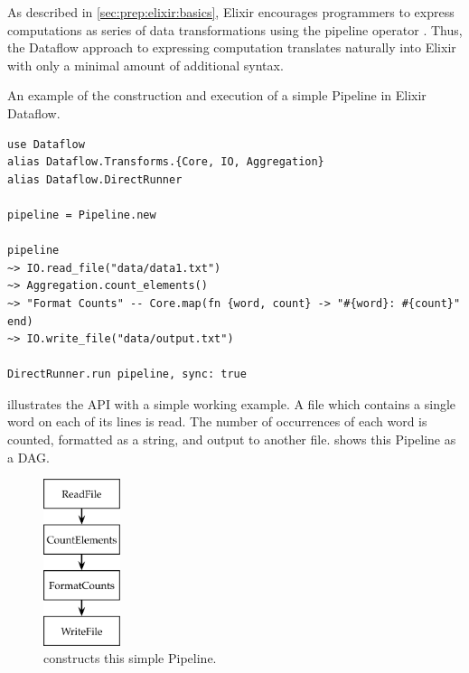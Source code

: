 As described in \cref{sec:prep:elixir:basics}, Elixir encourages programmers to express computations as series of data transformations using the pipeline operator \exs{|>}.
Thus, the Dataflow approach to expressing computation translates naturally into Elixir with only a minimal amount of additional syntax.

\begin{listing}[h]
	\caption[An example of Pipeline construction in Elixir.]{An example of the construction and execution of a simple Pipeline in Elixir Dataflow.}
	\label{lst:impl:elixir-construct-pipeline}
	\begin{verbatim}
use Dataflow
alias Dataflow.Transforms.{Core, IO, Aggregation}
alias Dataflow.DirectRunner

pipeline = Pipeline.new

pipeline
~> IO.read_file("data/data1.txt")
~> Aggregation.count_elements()
~> "Format Counts" -- Core.map(fn {word, count} -> "#{word}: #{count}" end)
~> IO.write_file("data/output.txt")

DirectRunner.run pipeline, sync: true

	\end{verbatim}
\end{listing}

 illustrates the API with a simple working example.
A file which contains a single word on each of its lines is read.
The number of occurrences of each word is counted, formatted as a string, and output to another file.
 shows this Pipeline as a DAG.

\begin{figure}[h]
	\centering
	\includegraphics[width=0.2\textwidth]{images/diags/dsl-simple-pipeline}
	\caption[A simple Pipeline constructed in \cref{lst:impl:elixir-construct-pipeline}.]{ constructs this simple Pipeline.}
	\label{fig:impl:dsl-simple-pipeline}
\end{figure}

